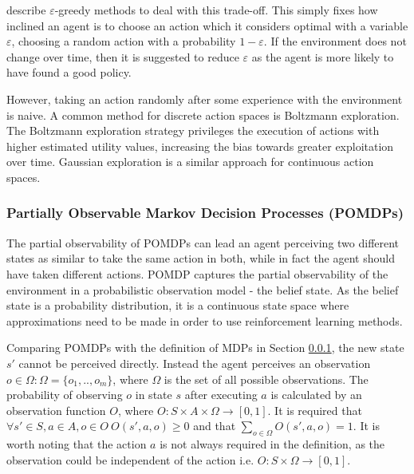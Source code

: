 \textcite{Sutton1998ai+reinforcement} describe \(\varepsilon\)-greedy methods
to deal with this trade-off. This simply fixes how inclined an agent is to
choose an action which it considers optimal with a variable \(\varepsilon\),
choosing a random action with a probability \(1-\varepsilon\). If the
environment does not change over time, then it is suggested to reduce
\(\varepsilon\) as the agent is more likely to have found a good policy.

However, taking an action randomly after some experience with the environment
is naive. A common method for discrete action spaces is Boltzmann exploration.
The Boltzmann exploration strategy privileges the execution of actions with
higher estimated utility values, increasing the bias towards greater
exploitation over time. Gaussian exploration is a similar approach for
continuous action spaces. \parencite{Hasselt2012ai+continuous}


\subsubsection{Partially Observable Markov Decision Processes (POMDPs)}
\label{sec:ai:pomdp}

The partial observability of POMDPs can lead an agent perceiving two different
states as similar to take the same action in both, while in fact the agent
should have taken different actions. POMDP captures the partial observability
of the environment in a probabilistic observation model - the belief state. As
the belief state is a probability distribution, it is a continuous state space
where approximations need to be made in order to use reinforcement learning
methods. \parencite{Russell2010ai+modern}

Comparing POMDPs with the definition of MDPs in Section \ref{sec:ai:pomdp}, the
new state \(s'\) cannot be perceived directly. Instead the agent perceives an
observation \(o \in \Omega : \Omega = \{o_1,..,o_m\}\), where \(\Omega\) is the
set of all possible observations. The probability of observing \(o\) in state
\(s\) after executing \(a\) is calculated by an observation function \(O\),
where \(O : S \times A \times \Omega \rightarrow [0,1] \). It is required that
\(\forall s' \in S, a \in A, o \in O ~ O (s', a, o) \geq 0 \) and that
\(\sum_{o \in \Omega}^{} O (s', a, o) = 1 \). It is worth noting that the
action \(a\) is not always required in the definition, as the observation could
be independent of the action i.e. \(O : S \times \Omega \rightarrow [0,1] \).
\parencite{Spaan2012ai+pomdp}

